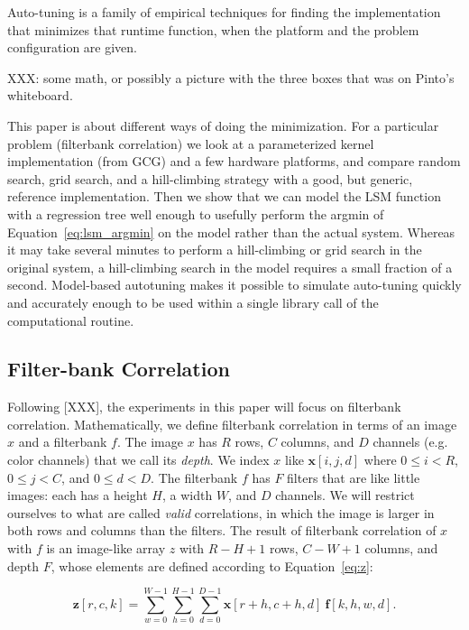 \documentclass{sig-alternate}
\begin{document}
Auto-tuning is a family of empirical techniques for finding the implementation
that minimizes that runtime function, when the platform and the problem
configuration are given.

XXX: some math, or possibly a picture with the three boxes that was on Pinto's
whiteboard.

This paper is about different ways of doing the minimization.
For a particular problem (filterbank correlation) we
look at a parameterized kernel implementation (from GCG)
and a few hardware platforms, and compare
random search, grid search, and a hill-climbing strategy with a good, but
generic, reference implementation.
Then we show that we can model the LSM function with a regression tree
well enough to usefully perform the argmin of Equation~\ref{eq:lsm_argmin}
on the model rather than the actual system. Whereas it may take several
minutes to perform a hill-climbing or grid search in the original system,
a hill-climbing search in the model requires a small fraction of a second.
Model-based autotuning makes it possible to simulate auto-tuning quickly and
accurately enough to be used within a single library call of the computational
routine.

\cite{volkov+demmel:2008}
\cite{vuduc:2003} %


\subsection{Filter-bank Correlation}

Following [XXX], the experiments in this paper will focus on filterbank
correlation.  Mathematically, we define filterbank correlation in terms of an
image $x$ and a filterbank $f$.
The image $x$ has $R$ rows, $C$ columns, and $D$ channels (e.g. color
channels) that we call its {\em depth}. We index $x$ like $\mathbf{x}[i,j,d]$
where $0 \leq i < R$, $0 \leq j < C$, and $0 \leq d < D$.
The filterbank $f$ has $F$ filters that are like little images: each has a
height $H$, a width $W$, and $D$ channels.
We will restrict ourselves to what are called {\em valid} correlations, in
which the image is larger in both rows and columns than the filters.
The result of filterbank correlation of $x$ with $f$ is an image-like array
$z$ with $R-H+1$ rows, $C-W+1$ columns, and depth $F$, whose elements are
defined according to Equation~\ref{eq:z}:

\begin{equation}
    \mathbf{z}[r,c,k] = \sum_{w=0}^{W-1} \sum_{h=0}^{H-1} \sum_{d=0}^{D-1}
        \mathbf{x}[r+h, c+h, d]~ \mathbf{f}[k, h, w, d].
        \label{eq:z}
\end{equation}
\end{document}
